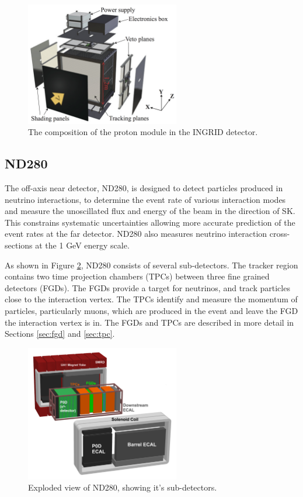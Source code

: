 \begin{figure}[!htbp]
\centering
\includegraphics*[width=0.6\textwidth,clip]{figs/protonmodule}
\caption{The composition of the proton module in the INGRID detector.} \label{protonmodule}
\end{figure}

\subsection{ND280}\label{sec:nd280}

The off-axis near detector, ND280, is designed to detect particles produced in neutrino interactions, to determine the event rate of various interaction modes and measure the unoscillated flux and energy of the beam in the direction of SK. This constrains systematic uncertainties allowing more accurate prediction of the event rates at the far detector. ND280 also measures neutrino interaction cross-sections at the 1 GeV energy scale. 

As shown in Figure \ref{nd280basket}, ND280 consists of several sub-detectors. The tracker region contains two time projection chambers (TPCs) between three fine grained detectors (FGDs). The FGDs provide a target for neutrinos, and track particles close to the interaction vertex. The TPCs identify and measure the momentum of particles, particularly muons, which are produced in the event and leave the FGD the interaction vertex is in. The FGDs and TPCs are described in more detail in Sections \ref{sec:fgd} and \ref{sec:tpc}.

\begin{figure}[!htbp]
\centering
\includegraphics*[width=0.6\textwidth,clip]{figs/nd280basket}
\caption{Exploded view of ND280, showing it's sub-detectors.} \label{nd280basket}
\end{figure}

